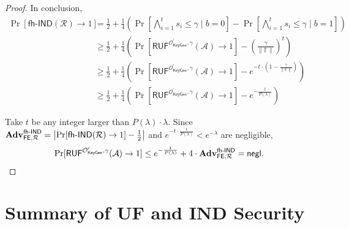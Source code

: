 \begin{proof}
In conclusion,
\begin{align*}
	\Pr[\textsf{fh-IND}(\mathcal{R}) \to 1] 
	&= \frac{1}{2} + \frac{1}{4} \left( \Pr \left[ \bigwedge_{i=1}^t s_i \leq \gamma \mid b = 0 \right] - \Pr \left[ \bigwedge_{i=1}^t s_i \leq \gamma \mid b = 1 \right] \right) \\
	&\geq \frac{1}{2} + \frac{1}{4} \left( \Pr[ \textsf{RUF}^{\mathcal{O}^\prime_{\textsf{KeyGen}}, \gamma}(\mathcal{A}) \to 1] - \left( \frac{\gamma}{\| \mathbb{F} \|} \right)^t \right) \\
	&\geq \frac{1}{2} + \frac{1}{4} \left( \Pr[ \textsf{RUF}^{\mathcal{O}^\prime_{\textsf{KeyGen}}, \gamma}(\mathcal{A}) \to 1] -  e^{- t \cdot (1 - \frac{\gamma}{\| \mathbb{F} \|}) } \right) \\
	&\geq \frac{1}{2} + \frac{1}{4} \left( \Pr[ \textsf{RUF}^{\mathcal{O}^\prime_{\textsf{KeyGen}}, \gamma}(\mathcal{A}) \to 1] -  e^{- \frac{t}{P(\lambda)} } \right)
\end{align*}

\noindent Take $t$ be any integer larger than $P(\lambda) \cdot \lambda$. Since $\mathbf{Adv}_{\textsf{FE}, \mathcal{R}}^\textsf{fh-IND} = \left| \Pr[\textsf{fh-IND}(\mathcal{R}) \to 1] - \frac{1}{2} \right|$ and $e^{-t \cdot \frac{1}{P(\lambda)}} < e^{-\lambda}$ are negligible,
\[
	\Pr[ \textsf{RUF}^{\mathcal{O}^\prime_{\textsf{KeyGen}}, \gamma}(\mathcal{A}) \to 1]  \leq e^{- \frac{t}{P(\lambda)} } + 4 \cdot \mathbf{Adv}_{\textsf{FE}, \mathcal{R}}^\textsf{fh-IND}  = \mathsf{negl}.
\]

\end{proof}


\newpage



\section{Summary of UF and IND Security}

